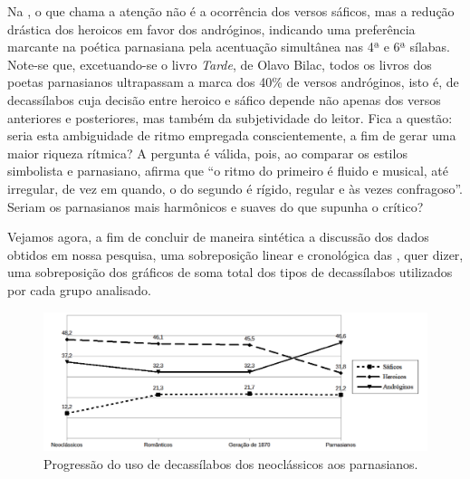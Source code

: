\documentclass[portuguese]{textolivre}
\begin{document}
Na , o que chama a atenção não é a ocorrência dos versos sáficos, mas a redução drástica dos heroicos em favor dos andróginos, indicando uma preferência marcante na poética parnasiana pela acentuação simultânea nas 4ª e 6ª sílabas. Note-se que, excetuando-se o livro \textit{Tarde}, de Olavo Bilac, todos os livros dos poetas parnasianos ultrapassam a marca dos 40\% de versos andróginos, isto é, de decassílabos cuja decisão entre heroico e sáfico depende não apenas dos versos anteriores e posteriores, mas também da subjetividade do leitor. Fica a questão: seria esta ambiguidade de ritmo empregada conscientemente, a fim de gerar uma maior riqueza rítmica? A pergunta é válida, pois, ao comparar os estilos simbolista e parnasiano, \textcite[p.~28]{ramos1965poesia} afirma que “o ritmo do primeiro é fluido e musical, até irregular, de vez em quando, o do segundo é rígido, regular e às vezes confragoso”. Seriam os parnasianos mais harmônicos e suaves do que supunha o crítico?

Vejamos agora, a fim de concluir de maneira sintética a discussão dos dados obtidos em nossa pesquisa, uma sobreposição linear e cronológica das , quer dizer, uma sobreposição dos gráficos de soma total dos tipos de decassílabos utilizados por cada grupo analisado.

\begin{figure}
    \centering
    \begin{minipage}{0.75\linewidth}
    \includegraphics[width=\linewidth]{fig-006.pdf}
    \caption{Progressão do uso de decassílabos dos neoclássicos aos parnasianos.}
    \label{fig6}
    \end{minipage}
\end{figure}
\end{document}
